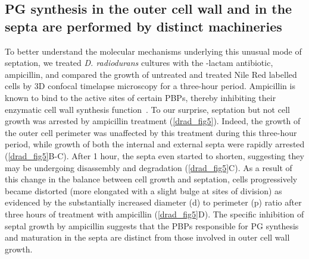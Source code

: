 \FloatBarrier

\subsection{PG synthesis in the outer cell wall and in the septa are performed by distinct machineries}

To better understand the molecular mechanisms underlying this unusual mode of septation, we treated \textit{D. radiodurans} cultures with the \beta-lactam antibiotic, ampicillin, and compared the growth of untreated and treated Nile Red labelled cells by 3D confocal timelapse microscopy for a three-hour period.
Ampicillin is known to bind to the active sites of certain PBPs, thereby inhibiting their enzymatic cell wall synthesis function~\cite{sauvageGlycosyltransferasesTranspeptidasesPenicillinBinding2016}.
To our surprise, septation but not cell growth was arrested by ampicillin treatment (\autoref{drad_fig5}).
Indeed, the growth of the outer cell perimeter was unaffected by this treatment during this three-hour period, while growth of both the internal and external septa were rapidly arrested (\autoref{drad_fig5}B-C).
After 1 hour, the septa even started to shorten, suggesting they may be undergoing disassembly and degradation (\autoref{drad_fig5}C).
As a result of this change in the balance between cell growth and septation, cells progressively became distorted (more elongated with a slight bulge at sites of division) as evidenced by the substantially increased diameter (d) to perimeter (p) ratio after three hours of treatment with ampicillin (\autoref{drad_fig5}D).
The specific inhibition of septal growth by ampicillin suggests that the PBPs responsible for PG synthesis and maturation in the septa are distinct from those involved in outer cell wall growth.

